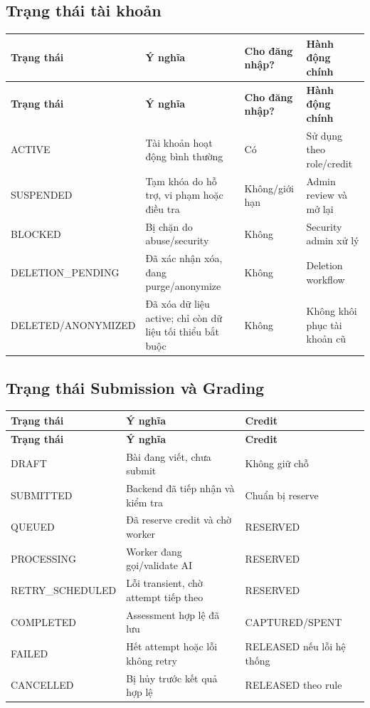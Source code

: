 \documentclass[11pt,a4paper]{article}
\begin{document}
\subsection{Trạng thái tài khoản}
\small
\setlength{\tabcolsep}{4pt}
\renewcommand{\arraystretch}{1.18}
\begin{longtable}{|P{0.19\textwidth}|P{0.36\textwidth}|P{0.16\textwidth}|P{0.21\textwidth}|}
\hline
\textbf{Trạng thái} & \textbf{Ý nghĩa} & \textbf{Cho đăng nhập?} & \textbf{Hành động chính} \\ \hline
\endfirsthead
\hline
\textbf{Trạng thái} & \textbf{Ý nghĩa} & \textbf{Cho đăng nhập?} & \textbf{Hành động chính} \\ \hline
\endhead
ACTIVE & Tài khoản hoạt động bình thường & Có & Sử dụng theo role/\allowbreak{}credit \\ \hline
SUSPENDED & Tạm khóa do hỗ trợ, vi phạm hoặc điều tra & Không/\allowbreak{}giới hạn & Admin review và mở lại \\ \hline
BLOCKED & Bị chặn do abuse/\allowbreak{}security & Không & Security admin xử lý \\ \hline
DELETION\_\allowbreak{}PENDING & Đã xác nhận xóa, đang purge/\allowbreak{}anonymize & Không & Deletion workflow \\ \hline
DELETED/\allowbreak{}ANONYMIZED & Đã xóa dữ liệu active; chỉ còn dữ liệu tối thiểu bắt buộc & Không & Không khôi phục tài khoản cũ \\ \hline
\end{longtable}
\normalsize
\subsection{Trạng thái Submission và Grading}
\small
\setlength{\tabcolsep}{4pt}
\renewcommand{\arraystretch}{1.18}
\begin{longtable}{|P{0.22\textwidth}|P{0.47\textwidth}|P{0.23\textwidth}|}
\hline
\textbf{Trạng thái} & \textbf{Ý nghĩa} & \textbf{Credit} \\ \hline
\endfirsthead
\hline
\textbf{Trạng thái} & \textbf{Ý nghĩa} & \textbf{Credit} \\ \hline
\endhead
DRAFT & Bài đang viết, chưa submit & Không giữ chỗ \\ \hline
SUBMITTED & Backend đã tiếp nhận và kiểm tra & Chuẩn bị reserve \\ \hline
QUEUED & Đã reserve credit và chờ worker & RESERVED \\ \hline
PROCESSING & Worker đang gọi/\allowbreak{}validate AI & RESERVED \\ \hline
RETRY\_\allowbreak{}SCHEDULED & Lỗi transient, chờ attempt tiếp theo & RESERVED \\ \hline
COMPLETED & Assessment hợp lệ đã lưu & CAPTURED/\allowbreak{}SPENT \\ \hline
FAILED & Hết attempt hoặc lỗi không retry & RELEASED nếu lỗi hệ thống \\ \hline
CANCELLED & Bị hủy trước kết quả hợp lệ & RELEASED theo rule \\ \hline
\end{longtable}
\normalsize
\end{document}

